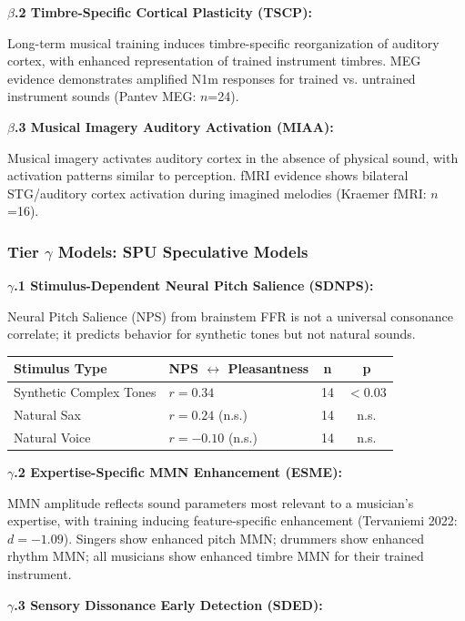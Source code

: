 \documentclass[9pt,onecolumn]{article}
\begin{document}
\textbf{$\beta$.2 Timbre-Specific Cortical Plasticity (TSCP):}

Long-term musical training induces timbre-specific reorganization of auditory cortex, with enhanced representation of trained instrument timbres. MEG evidence demonstrates amplified N1m responses for trained vs. untrained instrument sounds (Pantev MEG: $n$=24).

\textbf{$\beta$.3 Musical Imagery Auditory Activation (MIAA):}

Musical imagery activates auditory cortex in the absence of physical sound, with activation patterns similar to perception. fMRI evidence shows bilateral STG/auditory cortex activation during imagined melodies (Kraemer fMRI: $n$=16).

\subsubsection{Tier $\gamma$ Models: SPU Speculative Models}

\textbf{$\gamma$.1 Stimulus-Dependent Neural Pitch Salience (SDNPS):}

Neural Pitch Salience (NPS) from brainstem FFR is not a universal consonance correlate; it predicts behavior for synthetic tones but not natural sounds.

\begin{center}
\small
\begin{tabular}{@{}llcc@{}}
\toprule
\textbf{Stimulus Type} & \textbf{NPS $\leftrightarrow$ Pleasantness} & \textbf{n} & \textbf{p} \\
\midrule
Synthetic Complex Tones & $r=0.34$ & 14 & $<$0.03 \\
Natural Sax & $r=0.24$ (n.s.) & 14 & n.s. \\
Natural Voice & $r=-0.10$ (n.s.) & 14 & n.s. \\
\bottomrule
\end{tabular}
\end{center}

\textbf{$\gamma$.2 Expertise-Specific MMN Enhancement (ESME):}

MMN amplitude reflects sound parameters most relevant to a musician's expertise, with training inducing feature-specific enhancement (Tervaniemi 2022: $d=-1.09$). Singers show enhanced pitch MMN; drummers show enhanced rhythm MMN; all musicians show enhanced timbre MMN for their trained instrument.

\textbf{$\gamma$.3 Sensory Dissonance Early Detection (SDED):}
\end{document}
